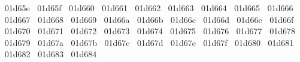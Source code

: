 {  ^^^^^^01d65e%
  ^^^^^^01d65f%
  ^^^^^^01d660%
  ^^^^^^01d661%
  ^^^^^^01d662%
  ^^^^^^01d663%
  ^^^^^^01d664%
  ^^^^^^01d665%
  ^^^^^^01d666%
  ^^^^^^01d667%
  ^^^^^^01d668%
  ^^^^^^01d669%
  ^^^^^^01d66a%
  ^^^^^^01d66b%
  ^^^^^^01d66c%
  ^^^^^^01d66d%
  ^^^^^^01d66e%
  ^^^^^^01d66f%
  ^^^^^^01d670%
  ^^^^^^01d671%
  ^^^^^^01d672%
  ^^^^^^01d673%
  ^^^^^^01d674%
  ^^^^^^01d675%
  ^^^^^^01d676%
  ^^^^^^01d677%
  ^^^^^^01d678%
  ^^^^^^01d679%
  ^^^^^^01d67a%
  ^^^^^^01d67b%
  ^^^^^^01d67c%
  ^^^^^^01d67d%
  ^^^^^^01d67e%
  ^^^^^^01d67f%
  ^^^^^^01d680%
  ^^^^^^01d681%
  ^^^^^^01d682%
  ^^^^^^01d683%
  ^^^^^^01d684%
}
